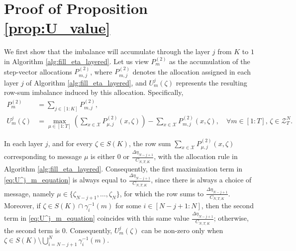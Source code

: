 \documentclass[11pt,letterpaper]{article}
\newcommand{\cX}{\mathcal{X}}
\newcommand{\cZ}{\mathcal{Z}}
\begin{document}
\section{Proof of Proposition \ref{prop:U_value}}\label{sec:prop_U_proof}

We first show that the imbalance will accumulate through the layer $j$ from $K$ to $1$ in Algorithm \ref{alg:fill_eta_layered}. Let us view $P_m^{(2)}$ as the accumulation of the step-vector allocations $P_{m,j}^{(2)}$, where $P_{m,j}^{(2)}$ denotes the allocation assigned in each layer $j$ of Algorithm \ref{alg:fill_eta_layered}, and $U_m^j(\zeta)$ represents the resulting row-sum imbalance induced by this allocation. Specifically,
\begin{align}
    P_m^{(2)} & = \sum_{j\in[1:K]} P_{m,j}^{(2)}, \\
    U_m^j(\zeta) & = \max_{\mu \in [1:T]}\left( \sum_{x \in \cX} P_{\mu,j}^{(2)}(x, \zeta) \right) - \sum_{x \in \cX} P_{m,j}^{(2)}(x, \zeta), \quad \forall m \in [1:T],\, \zeta \in \cZ^N_T. \label{eq:U^j_m_equation}
\end{align}

In each layer $j$, and for every $\zeta \in S(K)$, the row sum $\sum_{x \in \cX} P_{\mu,j}^{(2)}(x, \zeta)$ corresponding to message $\mu$ is either $0$ or $\tfrac{\Delta\eta_{N-j+1}}{C_{N,T,K}}$, with the allocation rule in Algorithm \ref{alg:fill_eta_layered}. Consequently, the first maximization term in \eqref{eq:U^j_m_equation} is always equal to $\tfrac{\Delta\eta_{N-j+1}}{C_{N,T,K}}$, since there is always a choice of message, namely $\mu \in \{\zeta_{N-j+1}, \dots, \zeta_{N}\}$, for which the row sums to $\tfrac{\Delta\eta_{N-j+1}}{C_{N,T,K}}$. Moreover, if $\zeta \in S(K) \cap \gamma_i^{-1}(m)$ for some $i \in [N-j+1:N]$, then the second term in \eqref{eq:U^j_m_equation} coincides with this same value $\tfrac{\Delta\eta_{N-j+1}}{C_{N,T,K}}$; otherwise, the second term is $0$. Consequently, $U^j_m(\zeta)$ can be non-zero only when $\zeta \in S(K) \setminus \bigcup_{i = N-j+1}^N \gamma_i^{-1}(m)$. 
\end{document}
